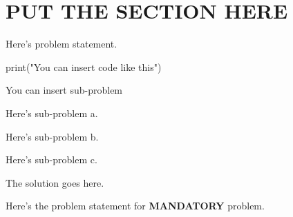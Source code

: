 \documentclass[a4paper, 10pt]{article}
\begin{document}
\subject
{}


\section{PUT THE SECTION HERE}

\begin{problem}
Here's problem statement.
\begin{codingbox}
    print("You can insert code like this")
\end{codingbox}
You can insert sub-problem
\begin{subproblems}
	\item Here's sub-problem a.
	\item Here's sub-problem b.
	\item Here's sub-problem c.
\end{subproblems}
\end{problem}

\begin{solution}
	The solution goes here.
\end{solution}

\begin{problem}
Here's the problem statement for \textbf{MANDATORY} problem.
\end{problem}
\end{document}
